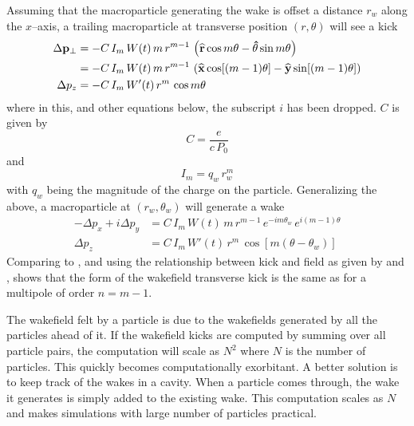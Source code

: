 Assuming that the macroparticle generating the wake is offset a distance $r_w$ along the $x$--axis,
a trailing macroparticle at transverse position $(r, \theta)$ will see a kick
\begin{align}
  \Delta {{\bf p}}_\perp &= 
    -C \, I_m \, W(t) \, m \, r^{m-1} \, \left( 
    {\widehat{\bf r}} \cos m\theta - {\bf\hat\theta} \sin m\theta \right) \\
  &= -C \, I_m \, W(t) \, m \, r^{m-1} \, \left( {\widehat{\bf x}} \cos [(m-1) \theta] - 
    {\widehat{\bf y}} \sin [(m-1)\theta] \right) \nonumber \\
  \Delta p_z &= -C \, I_m \, W'(t) \, r^m \, \cos m\theta
\end{align}
where in this, and other equations below, the subscript $i$ has been dropped. $C$ is given by
\begin{equation}
  C = \frac{e}{c \, P_0}
\end{equation}
 and
\begin{equation}
  I_m = q_w \, r_w^m
\end{equation}
with $q_w$ being the magnitude of the charge on the particle.  Generalizing the above, a
macroparticle at $(r_w, \theta_w)$ will generate a wake
\begin{align}
  -\Delta p_x + i\Delta p_y &= C \, I_m \, W(t) \, 
    m \, r^{m-1} \, e^{-i m \theta_w} \, e^{i (m-1) \theta} 
    \label{ppcimr} \\
  \Delta p_z &= C \, I_m \, W'(t) \, r^m \, \cos [m(\theta - \theta_w)]
    \label{pciwr}
\end{align}
Comparing  to , and using the relationship between kick and field as given by
 and , shows that the form of the wakefield transverse kick is the same as
for a multipole of order $n = m - 1$.

The wakefield felt by a particle is due to the wakefields generated by all the particles ahead of
it. If the wakefield kicks are computed by summing over all particle pairs, the computation will
scale as $N^2$ where $N$ is the number of particles. This quickly becomes computationally
exorbitant. A better solution is to keep track of the wakes in a cavity. When a particle comes
through, the wake it generates is simply added to the existing wake. This computation scales as $N$
and makes simulations with large number of particles practical.

